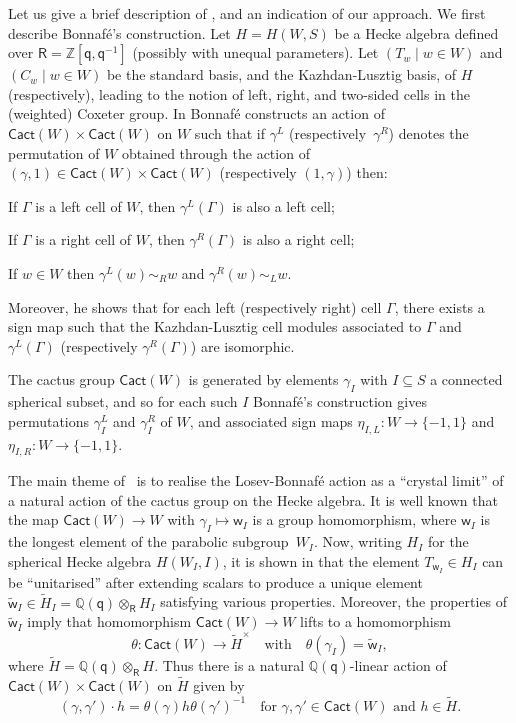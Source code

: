 \documentclass[11pt]{article}
\theoremstyle{plain}
\theoremstyle{definition}
\numberwithin{equation}{section}
\def\tw{\widetilde{\mathsf{w}}_I}
\def\cact{\mathsf{Cact}}
\newcommand{\Ga}{\Gamma}
\def\QQ{\mathbb{Q}}
\def\ZZ{\mathbb{Z}}
\def\sR{\mathsf{R}}
\newcommand{\sw}{\mathsf{w}}
\newcommand{\sq}{\mathsf{q}}
\begin{document}
Let us give a brief description of \cite[Conjecture~4.2]{RW:24}, and an indication of our approach. We first describe Bonnaf\'e's construction. Let $H=H(W,S)$ be a Hecke algebra defined over $\sR=\ZZ[\sq,\sq^{-1}]$ (possibly with unequal parameters). Let $(T_w\mid w\in W)$ and $(C_w\mid w\in W)$ be the standard basis, and the Kazhdan-Lusztig basis, of $H$ (respectively), leading to the notion of left, right, and two-sided cells in the (weighted) Coxeter group. In \cite{Bon:16} Bonnaf\'e constructs an action of $\cact(W)\times\cact(W)$ on $W$ such that if $\gamma^L$ (respectively~$\gamma^R$) denotes the permutation of $W$ obtained through the action of $(\gamma,1)\in\cact(W)\times\cact(W)$ (respectively $(1,\gamma)$) then:
\begin{compactenum}[$(1)$]
\item If $\Gamma$ is a left cell of $W$, then $\gamma^L(\Gamma)$ is also a left cell;
\item If $\Gamma$ is a right cell of $W$, then $\gamma^R(\Ga)$ is also a right cell;
\item If $w\in W$ then $\gamma^L(w)\sim_R w$ and $\gamma^R(w)\sim_L w$.
\end{compactenum}
Moreover, he shows that for each left (respectively right) cell $\Ga$, there exists a sign map such that the Kazhdan-Lusztig cell modules associated to $\Gamma$ and $\gamma^L(\Ga)$ (respectively $\gamma^R(\Ga)$) are isomorphic. 

The cactus group $\cact(W)$ is generated by elements $\gamma_I$ with $I\subseteq S$ a connected spherical subset, and so for each such $I$ Bonnaf\'e's construction gives permutations $\gamma_I^L$ and $\gamma_I^R$ of $W$, and associated sign maps $\eta_{I,L}:W\to\{-1,1\}$ and $\eta_{I,R}:W\to\{-1,1\}$. 


The main theme of~\cite{RW:24} is to realise the Losev-Bonnaf\'e action as a ``crystal limit'' of a natural action of the cactus group on the Hecke algebra. It is well known that the map $\cact(W)\to W$ with $\gamma_I\mapsto \sw_I$ is a group homomorphism, where $\sw_I$ is the longest element of the parabolic subgroup~$W_I$. Now, writing $H_I$ for the spherical Hecke algebra $H(W_I,I)$, it is shown in \cite{RW:24} that the element $T_{\sw_I}\in H_I$ can be ``unitarised'' after extending scalars to produce a unique element $\tw\in \tilde{H}_I=\QQ(\sq)\otimes_{\sR}H_I$ satisfying various properties. Moreover, the properties of $\tw$ imply that homomorphism $\cact(W)\to W$ lifts to a homomorphism
$$
\theta:\cact(W)\to \tilde{H}^{\times}\quad\text{with}\quad \theta(\gamma_I)=\tw,
$$
where $\tilde{H}=\QQ(\sq)\otimes_{\sR}H$. Thus there is a natural $\QQ(\sq)$-linear action of $\cact(W)\times\cact(W)$ on $\tilde{H}$ given by 
$$
(\gamma,\gamma')\cdot h=\theta(\gamma)h\theta(\gamma')^{-1}\quad\text{for $\gamma,\gamma'\in\cact(W)$ and $h\in \tilde{H}$.}
$$
\end{document}
